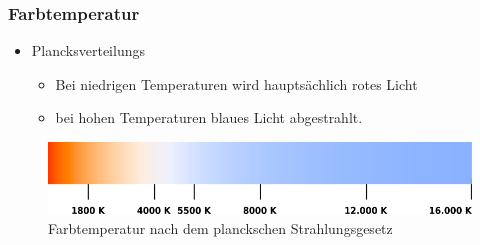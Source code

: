 \documentclass{beamer}
\begin{document}
\begin{frame}[t]\frametitle{Farbtemperatur}
\begin{itemize}
  \item Plancksverteilungs
  \begin{itemize}
  \item \small Bei niedrigen Temperaturen wird hauptsächlich rotes Licht
  \item \small bei hohen Temperaturen blaues Licht abgestrahlt.
\end{itemize}

\end{itemize}






\begin{figure}[!h]
\centering
      \includegraphics[width=\textwidth]{pics/ct.png}
      \caption*{\footnotesize Farbtemperatur nach dem planckschen Strahlungsgesetz}
 \end{figure}


\end{frame}
   
\end{document}
